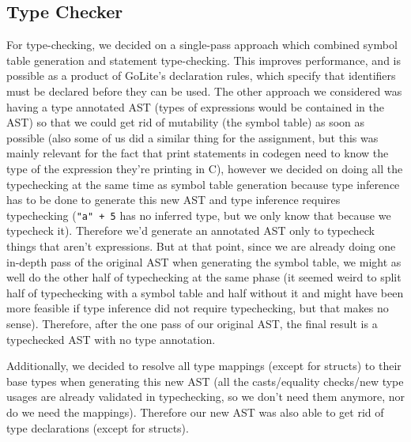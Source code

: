 \documentclass[11pt]{article}
\begin{document}
\subsection{Type Checker}
\label{sec:orgadbcb1f}
For type-checking, we decided on a single-pass approach which
combined symbol table generation and statement type-checking. This
improves performance, and is possible as a product of GoLite's
declaration rules, which specify that identifiers must be declared
before they can be used. The other approach we considered was
having a type annotated AST (types of expressions would be
contained in the AST) so that we could get rid of mutability (the
symbol table) as soon as possible (also some of us did a similar
thing for the assignment, but this was mainly relevant for the fact
that print statements in codegen need to know the type of the
expression they're printing in C), however we decided on doing all
the typechecking at the same time as symbol table generation
because type inference has to be done to generate this new AST and
type inference requires typechecking (\texttt{"a" + 5} has no inferred
type, but we only know that because we typecheck it). Therefore
we'd generate an annotated AST only to typecheck things that aren't
expressions. But at that point, since we are already doing one
in-depth pass of the original AST when generating the symbol table,
we might as well do the other half of typechecking at the same
phase (it seemed weird to split half of typechecking with a symbol
table and half without it and might have been more feasible if type
inference did not require typechecking, but that makes no
sense). Therefore, after the one pass of our original AST, the
final result is a typechecked AST with no type annotation.

Additionally, we decided to resolve all type mappings (except for
structs) to their base types when generating this new AST (all the
casts/equality checks/new type usages are already validated in
typechecking, so we don't need them anymore, nor do we need the
mappings). Therefore our new AST was also able to get rid of type
declarations (except for structs).
\end{document}
